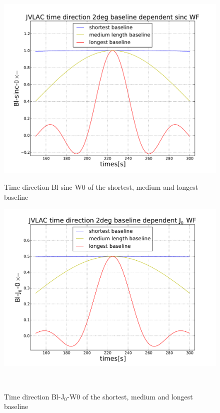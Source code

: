 \documentclass[useAMS,usenatbib]{mn2e}
\begin{document}
\begin{figure}
 \centering
  \begin{minipage}{0.38\linewidth}\includegraphics[width=1\textwidth]{./Figures/longshortmid-sinc.pdf}
  \caption{Time direction Bl-sinc-W0 of the shortest, medium and longest baseline}\label{fig:longshortmid-sinc}
  \end{minipage}
  \hspace{1cm}
  \begin{minipage}{0.38\linewidth}\includegraphics[width=1\textwidth]{./Figures/longshortmid-bessel.pdf}
  \caption{Time direction Bl-J$_0$-W0 of the shortest, medium and longest baseline}\label{fig:longshortmid-bessel}
  \end{minipage}\\

\end{figure}
\end{document}
